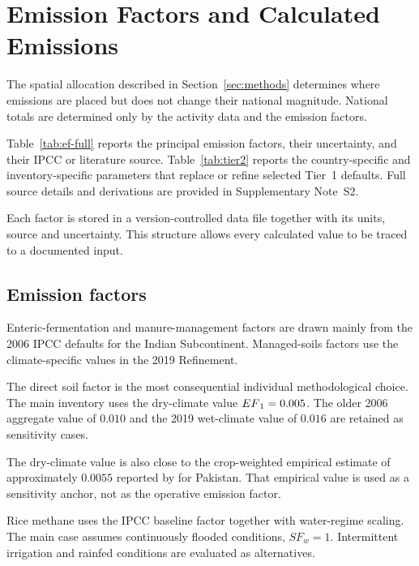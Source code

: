 \section{Emission Factors and Calculated Emissions}
\label{sec:ef}

The spatial allocation described in Section~\ref{sec:methods} determines where emissions are
placed but does not change their national magnitude. National totals are determined only by
the activity data and the emission factors.

Table~\ref{tab:ef-full} reports the principal emission factors, their uncertainty, and their
IPCC or literature source. Table~\ref{tab:tier2} reports the country-specific and
inventory-specific parameters that replace or refine selected Tier~1 defaults. Full source
details and derivations are provided in Supplementary Note~S2.

Each factor is stored in a version-controlled data file together with its units, source and
uncertainty. This structure allows every calculated value to be traced to a documented
input.

\subsection{Emission factors}

Enteric-fermentation and manure-management factors are drawn mainly from the 2006 IPCC
defaults for the Indian Subcontinent. Managed-soils factors use the climate-specific values
in the 2019 Refinement.

The direct soil \NtwoO{} factor is the most consequential individual methodological choice.
The main inventory uses the dry-climate value $EF\textsubscript{1}{}=0.005$. The older 2006 aggregate
value of $0.010$ and the 2019 wet-climate value of $0.016$ are retained as sensitivity
cases.

The dry-climate value is also close to the crop-weighted empirical estimate of approximately
$0.0055$ reported by \citet{cui2021} for Pakistan. That empirical value is used as a
sensitivity anchor, not as the operative emission factor.

Rice methane uses the IPCC baseline factor together with water-regime scaling. The main case
assumes continuously flooded conditions, $SF_w=1$. Intermittent irrigation and rainfed
conditions are evaluated as alternatives.

